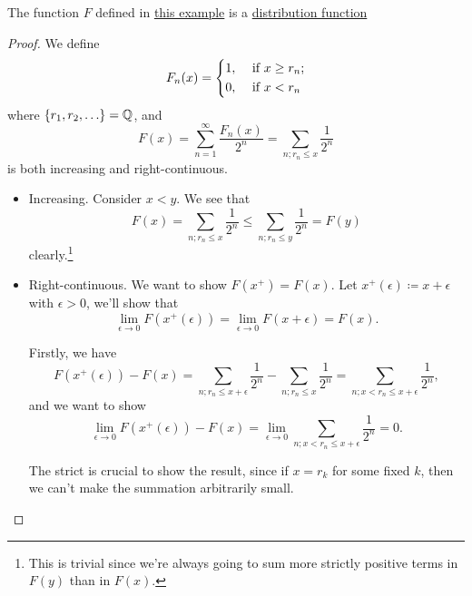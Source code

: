 \begin{lemma}\label{lma:lec7-eg:4-is-distribution-function}
	The function \(F\) defined in \hyperref[eg:lec8-3]{this example} is a \hyperref[def:distribution-function]{distribution function}
\end{lemma}
\begin{proof}
	\par We define
	\[
		F_{n}(x) = \begin{dcases}
			1, & \text{ if } x\geq r_{n} ; \\
			0, & \text{ if } x<r_{n}
		\end{dcases}
	\]
	where \(\{r_1, r_2, \ldots  \}= \mathbb{\MakeUppercase{q}} \), and
	\[
		F(x) = \sum\limits_{n=1}^{\infty} \frac{F_{n}(x)}{2^n} = \sum\limits_{n;r_{n}\leq x}\frac{1}{2^n}
	\]
	is both increasing and right-continuous.

	\begin{itemize}
		\item Increasing. Consider \(x<y\). We see that
		      \[
			      F(x) = \sum\limits_{n;r_{n}\leq x} \frac{1}{2^n} \leq \sum\limits_{n;r_{n}\leq y} \frac{1}{2^n} = F(y)
		      \]
		      clearly.\footnote{This is trivial since we're always going to sum more strictly positive terms in \(F(y)\) than in \(F(x)\).}
		\item Right-continuous. We want to show \(F(x^+) = F(x)\). Let \(x^+(\epsilon )\coloneqq x + \epsilon \) with \(\epsilon >0\), we'll show that
		      \[
			      \lim\limits_{\epsilon\to 0}F(x^+(\epsilon )) =  \lim\limits_{\epsilon \to 0} F(x + \epsilon ) = F(x).
		      \]

		      Firstly, we have
		      \[
			      F(x^+(\epsilon )) - F(x) = \sum\limits_{n;r_{n}\leq x+\epsilon } \frac{1}{2^n} - \sum\limits_{n;r_{n}\leq x}\frac{1}{2^n} = \sum\limits_{n;x<r_{n}\leq x+\epsilon}\frac{1}{2^n},
		      \]
		      and we want to show
		      \[
			      \lim\limits_{\epsilon \to 0}F(x^+(\epsilon )) - F(x) = \lim\limits_{\epsilon \to 0}\sum\limits_{n;x< r_{n}\leq x+\epsilon }\frac{1}{2^n} = 0.
		      \]
		      \begin{remark}
			      The strict is crucial to show the result, since if \(x = r_k\) for some fixed \(k\), then we can't make the summation arbitrarily small.
		      \end{remark}


\end{itemize}
\end{proof}
